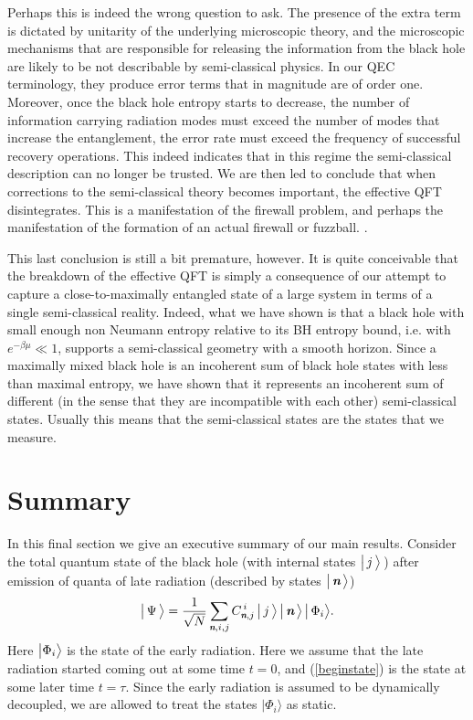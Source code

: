 \documentclass[12pt]{article}%
\def\be{\begin{equation}}
\def\ee{\end{equation}}
\begin{document}
 
Perhaps this is indeed the wrong question to ask.  The presence of the extra term is dictated by unitarity of
the underlying microscopic theory, and the microscopic mechanisms that are responsible for releasing the information from the black hole 
are likely to be not describable by semi-classical physics. In our QEC terminology, they produce error terms that in magnitude 
are of order one. Moreover, once the black hole entropy starts to decrease, the number 
of information carrying radiation modes must exceed the number of modes that increase the entanglement, the error rate  must
exceed the frequency of successful recovery operations. This indeed indicates that in this regime the semi-classical description can no longer be trusted.  
We are then led to conclude that when corrections to the semi-classical theory  becomes important,
the effective QFT disintegrates. 
This is a manifestation of the firewall problem, and perhaps the manifestation of the formation of an actual firewall or fuzzball. \cite{mathur-fuzzball-review}. 


This last conclusion is still a bit premature, however. It is quite conceivable that the breakdown of the effective QFT is simply a consequence of
our attempt to capture a close-to-maximally entangled state of a large system in terms of a single semi-classical reality. Indeed, what we have
shown is that a black hole with small enough non Neumann entropy relative to its BH entropy bound,  i.e. with $e^{-\beta\mu}\ll1$, supports 
a semi-classical geometry with a smooth horizon. Since a maximally mixed black hole is an incoherent sum of black hole states with less than 
maximal entropy, we have shown that it represents an incoherent sum of different (in the sense that they are incompatible with each other) semi-classical states. 
Usually this means that the semi-classical states are the states that we measure.


\section{Summary}

In this final section we give an executive summary of our main results. Consider the total quantum state of the black hole (with internal states $\bigl| \,j\, \bigr\rangle \,$) after emission of quanta of late radiation (described by states $\bigl| \,{ \textit{\textbf n}}\, \bigr\rangle$) 
\be
\label{beginstate}
\bigl|\,\Psi \,\bigr\rangle ={1\over\sqrt{N}}\sum_{\nom,i, j} C^{\,i}_{\nom, j} \,\bigl| \,j\,\bigr \rangle \,\bigl| \,\nom\,\bigr \rangle\, \bigl| \,\Phi_i\bigr \rangle. 
\ee
Here $\bigl|\Phi_i\bigr\rangle$ is the state of the  early radiation. Here we assume that the late radiation started
coming out at some time $t=0$, and (\ref{beginstate}) is the state at some later time $t =\tau$. Since the early radiation is assumed to be dynamically
decoupled, we are allowed to treat the states $\bigl|\Phi_i\bigr\rangle$ as static.
\end{document}
